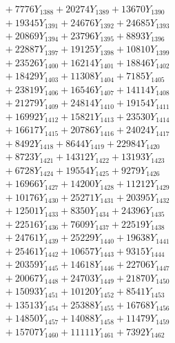 \documentclass[a4paper,10pt]{article}
\begin{document}
{\begin{align}
&\;  + 7776 Y_{1388} + 20274 Y_{1389} + 13670 Y_{1390} \\[0.3ex]
&\;  + 19345 Y_{1391} + 24676 Y_{1392} + 24685 Y_{1393} \\[0.3ex]
&\;  + 20869 Y_{1394} + 23796 Y_{1395} + 8893 Y_{1396} \\[0.3ex]
&\;  + 22887 Y_{1397} + 19125 Y_{1398} + 10810 Y_{1399} \\[0.3ex]
&\;  + 23526 Y_{1400} + 16214 Y_{1401} + 18846 Y_{1402} \\[0.3ex]
&\;  + 18429 Y_{1403} + 11308 Y_{1404} + 7185 Y_{1405} \\[0.3ex]
&\;  + 23819 Y_{1406} + 16546 Y_{1407} + 14114 Y_{1408} \\[0.5ex]\allowbreak
&\;  + 21279 Y_{1409} + 24814 Y_{1410} + 19154 Y_{1411} \\[0.3ex]
&\;  + 16992 Y_{1412} + 15821 Y_{1413} + 23530 Y_{1414} \\[0.3ex]
&\;  + 16617 Y_{1415} + 20786 Y_{1416} + 24024 Y_{1417} \\[0.3ex]
&\;  + 8492 Y_{1418} + 8644 Y_{1419} + 22984 Y_{1420} \\[0.3ex]
&\;  + 8723 Y_{1421} + 14312 Y_{1422} + 13193 Y_{1423} \\[0.3ex]
&\;  + 6728 Y_{1424} + 19554 Y_{1425} + 9279 Y_{1426} \\[0.3ex]
&\;  + 16966 Y_{1427} + 14200 Y_{1428} + 11212 Y_{1429} \\[0.3ex]
&\;  + 10176 Y_{1430} + 25271 Y_{1431} + 20395 Y_{1432} \\[0.3ex]
&\;  + 12501 Y_{1433} + 8350 Y_{1434} + 24396 Y_{1435} \\[0.3ex]
&\;  + 22516 Y_{1436} + 7609 Y_{1437} + 22519 Y_{1438} \\[0.5ex]\allowbreak
&\;  + 24761 Y_{1439} + 25229 Y_{1440} + 19638 Y_{1441} \\[0.3ex]
&\;  + 25461 Y_{1442} + 10657 Y_{1443} + 9315 Y_{1444} \\[0.3ex]
&\;  + 20359 Y_{1445} + 14618 Y_{1446} + 22706 Y_{1447} \\[0.3ex]
&\;  + 20067 Y_{1448} + 24703 Y_{1449} + 21870 Y_{1450} \\[0.3ex]
&\;  + 15093 Y_{1451} + 10120 Y_{1452} + 8541 Y_{1453} \\[0.3ex]
&\;  + 13513 Y_{1454} + 25388 Y_{1455} + 16768 Y_{1456} \\[0.3ex]
&\;  + 14850 Y_{1457} + 14088 Y_{1458} + 11479 Y_{1459} \\[0.3ex]
&\;  + 15707 Y_{1460} + 11111 Y_{1461} + 7392 Y_{1462} \\[0.3ex]

\end{align}}
\end{document}
